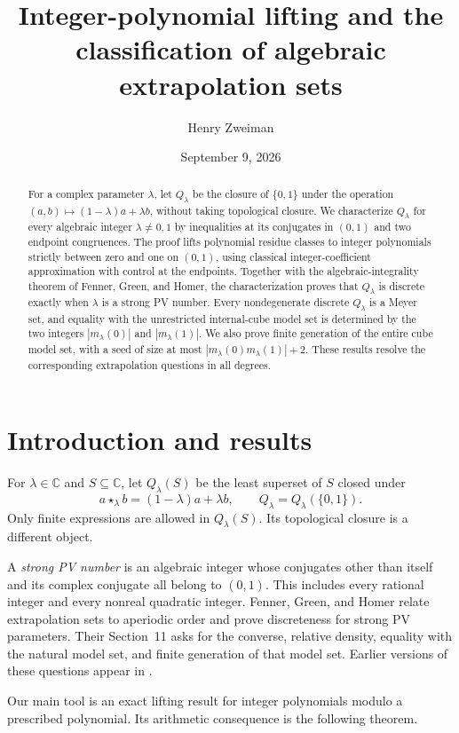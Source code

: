 \documentclass[11pt]{article}
\title{Integer-polynomial lifting and the classification of algebraic extrapolation sets}
\author{Henry Zweiman}
\date{September 9, 2026}
\theoremstyle{remark}
\newcommand{\C}{\mathbb C}
\begin{document}
\maketitle
\begin{abstract}
For a complex parameter $\lambda$, let $Q_\lambda$ be the closure of $\{0,1\}$ under the operation $(a,b)\mapsto(1-\lambda)a+\lambda b$, without taking topological closure. We characterize $Q_\lambda$ for every algebraic integer $\lambda\ne0,1$ by inequalities at its conjugates in $(0,1)$ and two endpoint congruences. The proof lifts polynomial residue classes to integer polynomials strictly between zero and one on $(0,1)$, using classical integer-coefficient approximation with control at the endpoints. Together with the algebraic-integrality theorem of Fenner, Green, and Homer, the characterization proves that $Q_\lambda$ is discrete exactly when $\lambda$ is a strong PV number. Every nondegenerate discrete $Q_\lambda$ is a Meyer set, and equality with the unrestricted internal-cube model set is determined by the two integers $|m_\lambda(0)|$ and $|m_\lambda(1)|$. We also prove finite generation of the entire cube model set, with a seed of size at most $|m_\lambda(0)m_\lambda(1)|+2$. These results resolve the corresponding extrapolation questions in all degrees.
\end{abstract}

\section{Introduction and results}
For $\lambda\in\C$ and $S\subseteq\C$, let $Q_\lambda(S)$ be the least superset of $S$ closed under
\[
 a\star_\lambda b=(1-\lambda)a+\lambda b,
 \qquad Q_\lambda=Q_\lambda(\{0,1\}).
\]
Only finite expressions are allowed in $Q_\lambda(S)$. Its topological closure is a different object.

A \emph{strong PV number} is an algebraic integer whose conjugates other than itself and its complex conjugate all belong to $(0,1)$. This includes every rational integer and every nonreal quadratic integer. Fenner, Green, and Homer \cite{FGH2026} relate extrapolation sets to aperiodic order and prove discreteness for strong PV parameters. Their Section~11 asks for the converse, relative density, equality with the natural model set, and finite generation of that model set. Earlier versions of these questions appear in \cite{FGH2018,FGH2020}.

Our main tool is an exact lifting result for integer polynomials modulo a prescribed polynomial. Its arithmetic consequence is the following theorem.
\end{document}
